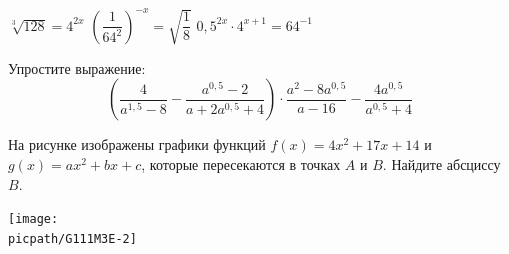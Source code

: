 \begin{class}[number=3]
\begin{listofex}
\begin{tasks}
			\task \( \sqrt[3]{128}=4^{2x} \)
			\task \( \left( \dfrac{1}{64^2} \right)^{-x}=\sqrt{\dfrac{1}{8}} \)
			\task \( 0,5^{2x}\cdot 4^{x+1}=64^{-1} \)
		\end{tasks}
		\item Упростите выражение: \[ \left( \dfrac{4}{a^{1,5}-8} - \dfrac{a^{0,5}-2}{a+2a^{0,5}+4} \right) \cdot \dfrac{a^2-8a^{0,5}}{a-16} - \dfrac{4a^{0,5}}{a^{0,5}+4} \]
		\item 
		\begin{minipage}[t]{\bodywidth}
			На рисунке изображены графики функций \( f(x)=4x^2+17x+14 \) и \( g(x)=ax^2+bx+c \), которые пересекаются в точках \(A\) и \(B\). Найдите абсциссу  \( B \).
		\end{minipage}
		\hspace{0.02\linewidth}
		\begin{minipage}[t]{\picwidth}
			\texttt{[image: \\picpath/G111M3E-2]}
		\end{minipage}
	\end{listofex}
\end{class}

